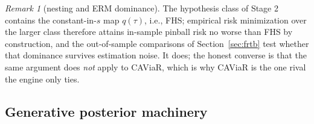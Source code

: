 \documentclass[11pt]{article}
\theoremstyle{remark}
\newtheorem{remark}{Remark}
\begin{document}
\begin{remark}[nesting and ERM dominance]\label{rem:nesting}
The hypothesis class of Stage 2 contains the constant-in-$s$ map
$q(\tau)$, i.e., FHS; empirical risk minimization over the larger class
therefore attains in-sample pinball risk no worse than FHS by
construction, and the out-of-sample comparisons of
Section~\ref{sec:frtb} test whether that dominance survives estimation
noise. It does; the honest converse is that the same argument does
\emph{not} apply to CAViaR, which is why CAViaR is the one rival the
engine only ties.
\end{remark}


\subsection{Generative posterior machinery}\label{sec:posteriormethod}
\end{document}
